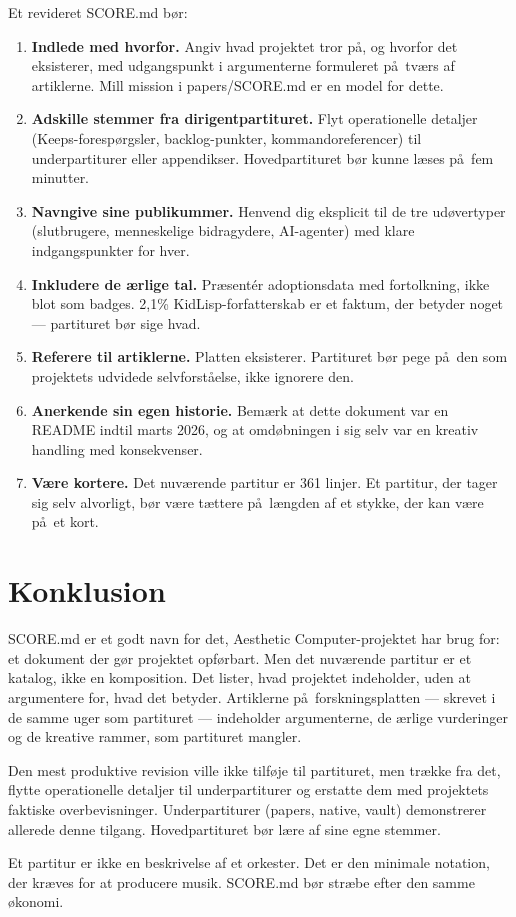 \documentclass[10pt,letterpaper,twocolumn]{article}
\begin{document}
Et revideret SCORE.md b\o r:

\begin{enumerate}
\item \textbf{Indlede med hvorfor.} Angiv hvad projektet tror p\aa , og hvorfor det eksisterer, med udgangspunkt i argumenterne formuleret p\aa\ tv\ae rs af artiklerne. Mill mission i papers/SCORE.md er en model for dette.
\item \textbf{Adskille stemmer fra dirigentpartituret.} Flyt operationelle detaljer (Keeps-foresp\o rgsler, backlog-punkter, kommandoreferencer) til underpartiturer eller appendikser. Hovedpartituret b\o r kunne l\ae ses p\aa\ fem minutter.
\item \textbf{Navngive sine publikummer.} Henvend dig eksplicit til de tre ud\o vertyper (slutbrugere, menneskelige bidragydere, AI-agenter) med klare indgangspunkter for hver.
\item \textbf{Inkludere de \ae rlige tal.} Pr\ae sent\' er adoptionsdata med fortolkning, ikke blot som badges. 2,1\% KidLisp-forfatterskab er et faktum, der betyder noget --- partituret b\o r sige hvad.
\item \textbf{Referere til artiklerne.} Platten eksisterer. Partituret b\o r pege p\aa\ den som projektets udvidede selvforst\aa else, ikke ignorere den.
\item \textbf{Anerkende sin egen historie.} Bem\ae rk at dette dokument var en README indtil marts 2026, og at omd\o bningen i sig selv var en kreativ handling med konsekvenser.
\item \textbf{V\ae re kortere.} Det nuv\ae rende partitur er 361 linjer. Et partitur, der tager sig selv alvorligt, b\o r v\ae re t\ae ttere p\aa\ l\ae ngden af et stykke, der kan v\ae re p\aa\ et kort.
\end{enumerate}

\section{Konklusion}

SCORE.md er et godt navn for det, Aesthetic Computer-projektet har brug for: et dokument der g\o r projektet opf\o rbart. Men det nuv\ae rende partitur er et katalog, ikke en komposition. Det lister, hvad projektet indeholder, uden at argumentere for, hvad det betyder. Artiklerne p\aa\ forskningsplatten --- skrevet i de samme uger som partituret --- indeholder argumenterne, de \ae rlige vurderinger og de kreative rammer, som partituret mangler.

Den mest produktive revision ville ikke tilf\o je til partituret, men tr\ae kke fra det, flytte operationelle detaljer til underpartiturer og erstatte dem med projektets faktiske overbevisninger. Underpartiturer (papers, native, vault) demonstrerer allerede denne tilgang. Hovedpartituret b\o r l\ae re af sine egne stemmer.

Et partitur er ikke en beskrivelse af et orkester. Det er den minimale notation, der kr\ae ves for at producere musik. SCORE.md b\o r str\ae be efter den samme \o konomi.



\end{document}
